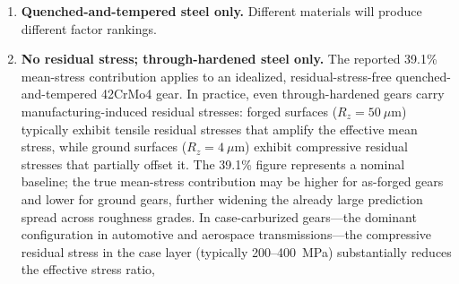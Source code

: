\documentclass[12pt,a4paper]{article}
\begin{document}
\begin{enumerate}
        I caution that the narrow bootstrap CIs for the dominant factors
        quantify \emph{sampling} variability conditional on the observed
        censoring pattern, not the \emph{identifiability} of the
        underlying parameters. At 64\% censoring, the likelihood surface
        may possess shallow local maxima or flat ridges that bootstrap
        resampling cannot detect because each bootstrap replicate
        inherits the same censoring structure. The numerical variance
        fractions for the three dominant factors (39.1\%, 35.3\%,
        23.5\%) represent the best available
        point estimates under the log-normal AFT specification, not as
        uniquely identified values. As a practical check, the EM decomposition
        was repeated with 8 different random seeds; the variance fractions are
        identical to the reported precision across all seeds, confirming that
        the likelihood surface possesses a well-defined global maximum at 64\%
        censoring for this dataset. Their qualitative ranking
        (MS $>$ Std $>$ Rz) is robust across all bootstrap replicates
        and sensitivity analyses reported in this study. The S--N
        curve source ($-0.7$\%) and cumulative damage rule (0.3\%) are
        below the noise floor of the 64\%-censored design and should
        not be assigned physical interpretation.
  \item \textbf{Quenched-and-tempered steel only.} Different materials
        will produce different factor rankings.
  \item \textbf{No residual stress; through-hardened steel only.} The
        reported 39.1\% mean-stress contribution applies to an idealized,
        residual-stress-free quenched-and-tempered 42CrMo4 gear. In
        practice, even through-hardened gears carry manufacturing-induced
        residual stresses: forged surfaces ($R_z=50~\mu$m) typically
        exhibit tensile residual stresses that amplify the effective mean
        stress, while ground surfaces ($R_z=4~\mu$m) exhibit compressive
        residual stresses that partially offset it. The 39.1\% figure
        represents a nominal baseline; the true mean-stress
        contribution may be higher for as-forged gears and lower for
        ground gears, further widening the already large prediction spread
        across roughness grades. In case-carburized gears---the dominant
        configuration in automotive and aerospace transmissions---the
        compressive residual stress in the case layer (typically
        200--400~MPa) substantially reduces the effective stress ratio,

\end{enumerate}
\end{document}
